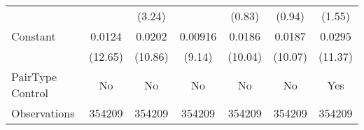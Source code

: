 {\begin{tabular}{l*{6}{c}}
                    &                     &      (3.24)         &                     &      (0.83)         &      (0.94)         &      (1.55)         \\
[1em]
Constant            &      0.0124\sym{***}&      0.0202\sym{***}&     0.00916\sym{***}&      0.0186\sym{***}&      0.0187\sym{***}&      0.0295\sym{***}\\
                    &     (12.65)         &     (10.86)         &      (9.14)         &     (10.04)         &     (10.07)         &     (11.37)         \\
\hline
PairType Control    &          No         &          No         &          No         &          No         &          No         &         Yes         \\
Observations        &      354209         &      354209         &      354209         &      354209         &      354209         &      354209         \\
\hline\hline  \end{tabular}}
